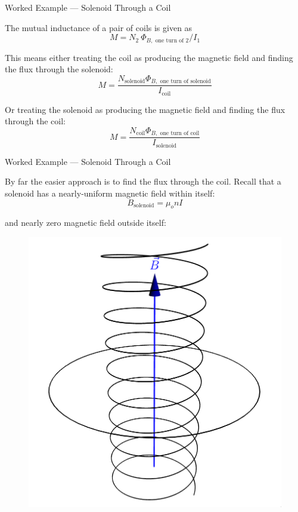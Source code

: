 \documentclass{beamer}
\begin{document}
\begin{frame}{Worked Example --- Solenoid Through a Coil}

The mutual inductance of a pair of coils is given as
\begin{equation*}
    M = N_2\ \Phi_{B, \text{ one turn of 2}} / I_1
\end{equation*}

This means either treating the coil as producing the magnetic field and finding the flux through the solenoid:
\begin{equation*}
    M = \frac{N_{\text{solenoid}} \Phi_{B, \text{ one turn of solenoid}}}{I_{\text{coil}}}
\end{equation*}

Or treating the solenoid as producing the magnetic field and finding the flux through the coil:
\begin{equation*}
    M = \frac{N_{\text{coil}} \Phi_{B, \text{ one turn of coil}}}{I_{\text{solenoid}}}
\end{equation*}

\end{frame}

\begin{frame}{Worked Example --- Solenoid Through a Coil}

By far the easier approach is to find the flux through the coil. Recall that a solenoid has a nearly-uniform magnetic field within itself:
\begin{equation*}
    B_{\text{solenoid}} = \mu_o n I
\end{equation*}

and nearly zero magnetic field outside itself:

\begin{figure}[H]
\centering
\includegraphics[height=0.5\textheight]{figures/solenoid_bfield.png}
\end{figure}

\end{frame}
\end{document}

